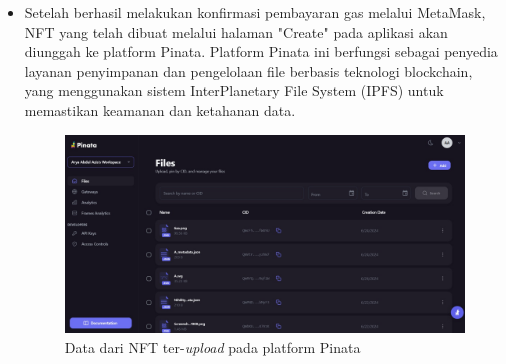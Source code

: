 \begin{itemize}
        \item Setelah berhasil melakukan konfirmasi pembayaran gas melalui MetaMask, NFT yang telah dibuat melalui halaman "Create" pada aplikasi akan diunggah ke platform Pinata. Platform Pinata ini berfungsi sebagai penyedia layanan penyimpanan dan pengelolaan file berbasis teknologi blockchain, yang menggunakan sistem InterPlanetary File System (IPFS) untuk memastikan keamanan dan ketahanan data.
        
        \begin{figure} [H] \centering
          \includegraphics[scale=0.26]{gambar/pinata.jpeg}
          \caption{Data dari NFT ter-\emph{upload} pada platform Pinata}
          \label{fig:pinata}
          \end{figure}


\end{itemize}
